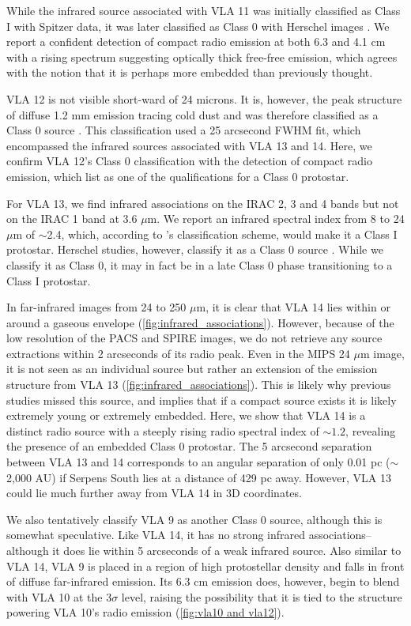 \documentclass[apj]{emulateapj}
\begin{document}
While the infrared source associated with VLA 11 was initially classified as Class I with Spitzer data, it was later classified as Class 0 with Herschel images \citep{Bontemps10}. We report a confident detection  of compact radio emission at both 6.3 and 4.1 cm with a rising spectrum suggesting optically thick free-free emission, which agrees with the notion that it is perhaps more embedded than previously thought. 

VLA 12 is not visible short-ward of 24 microns. It is, however, the peak structure of diffuse 1.2 mm emission tracing cold dust and was therefore classified as a Class 0 source \citep{Maury11}. This classification used a 25 arcsecond FWHM fit, which encompassed the infrared sources associated with VLA 13 and 14. Here, we confirm VLA 12's Class 0 classification with the detection of compact radio emission, which \citet{Andre00} list as one of the qualifications for a Class 0 protostar.

For VLA 13, we find infrared associations on the IRAC 2, 3 and 4 bands but not on the IRAC 1 band at 3.6 $\mu$m. We report an infrared spectral index from 8 to 24 $\mu$m of $\sim$2.4, which, according to \citet{Lada87}'s classification scheme, would make it a Class I protostar. Herschel studies, however, classify it as a Class 0 source \citep{Bontemps10}. While we classify it as Class 0, it may in fact be in a late Class 0 phase transitioning to a Class I protostar.

In far-infrared images from 24 to 250 $\mu$m, it is clear that VLA 14 lies within or around a gaseous envelope (\autoref{fig:infrared_associations}). However, because of the low resolution of the PACS and SPIRE images, we do not retrieve any source extractions within 2 arcseconds of its radio peak. Even in the MIPS 24 $\mu$m image, it is not seen as an individual source but rather an extension of the emission structure from VLA 13 (\autoref{fig:infrared_associations}). This is likely why previous studies missed this source, and implies that if a compact source exists it is likely extremely young or extremely embedded. Here, we show that VLA 14 is a distinct radio source with a steeply rising radio spectral index of $\sim 1.2$, revealing the presence of an embedded Class 0 protostar. The 5 arcsecond separation between VLA 13 and 14 corresponds to an angular separation of only 0.01 pc ($\sim$2,000 AU) if Serpens South lies at a distance of 429 pc away. However, VLA 13 could lie much further away from VLA 14 in 3D coordinates.

We also tentatively classify VLA 9 as another Class 0 source, although this is somewhat speculative. Like VLA 14, it has no strong infrared associations--although it does lie within 5 arcseconds of a weak infrared source. Also similar to VLA 14, VLA 9 is placed in a region of high protostellar density and falls in front of diffuse far-infrared emission. Its 6.3 cm emission does, however, begin to blend with VLA 10 at the 3$\sigma$ level, raising the possibility that it is tied to the structure powering VLA 10's radio emission (\autoref{fig:vla10 and vla12}).
\end{document}
